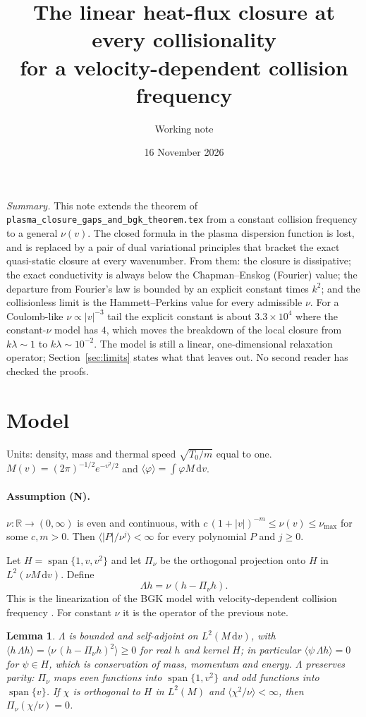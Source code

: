 \documentclass[11pt]{article}
\title{The linear heat-flux closure at every collisionality\\
for a velocity-dependent collision frequency}
\author{Working note}
\date{16 November 2026}
\newcommand{\dd}{\mathrm{d}}
\newcommand{\avg}[1]{\langle #1\rangle}
\newtheorem{lemma}[theorem]{Lemma}
\theoremstyle{remark}
\begin{document}
\maketitle

\noindent\emph{Summary.} This note extends the theorem of
\texttt{plasma\_closure\_gaps\_and\_bgk\_theorem.tex} from a constant
collision frequency to a general $\nu(v)$. The closed formula in the plasma
dispersion function is lost, and is replaced by a pair of dual variational
principles that bracket the exact quasi-static closure at every wavenumber.
From them: the closure is dissipative; the exact conductivity is always
below the Chapman--Enskog (Fourier) value; the departure from Fourier's law
is bounded by an explicit constant times $k^2$; and the collisionless limit
is the Hammett--Perkins value for every admissible $\nu$. For a
Coulomb-like $\nu\propto|v|^{-3}$ tail the explicit constant is about
$3.3\times10^4$ where the constant-$\nu$ model has $4$, which moves the
breakdown of the local closure from $k\lambda\sim1$ to
$k\lambda\sim10^{-2}$. The model is still a linear, one-dimensional
relaxation operator; Section~\ref{sec:limits} states what that leaves out.
No second reader has checked the proofs.

\section{Model}

Units: density, mass and thermal speed $\sqrt{T_0/m}$ equal to one.
$M(v) = (2\pi)^{-1/2}e^{-v^2/2}$ and $\avg{\varphi} = \int\varphi M\,\dd v$.

\paragraph{Assumption (N).} $\nu:\mathbb{R}\to(0,\infty)$ is even and
continuous, with $c\,(1+|v|)^{-m}\le\nu(v)\le\nu_{\max}$ for some $c,m>0$.
Then $\avg{|P|/\nu^j}<\infty$ for every polynomial $P$ and $j\ge0$.

\medskip
Let $H = \operatorname{span}\{1,v,v^2\}$ and let $\Pi_\nu$ be the orthogonal
projection onto $H$ in $L^2(\nu M\,\dd v)$. Define
\begin{equation}
  \Lambda h = \nu\,(h - \Pi_\nu h).
\end{equation}
This is the linearization of the BGK model with velocity-dependent collision
frequency \cite{Struchtrup}. For constant $\nu$ it is the operator of the
previous note.

\begin{lemma}\label{lem:Lambda}
$\Lambda$ is bounded and self-adjoint on $L^2(M\,\dd v)$, with
$\avg{h\,\Lambda h} = \avg{\nu\,(h-\Pi_\nu h)^2}\ge0$ for real $h$ and kernel
$H$; in particular $\avg{\psi\,\Lambda h} = 0$ for $\psi\in H$, which is
conservation of mass, momentum and energy. $\Lambda$ preserves parity:
$\Pi_\nu$ maps even functions into $\operatorname{span}\{1,v^2\}$ and odd
functions into $\operatorname{span}\{v\}$. If $\chi$ is orthogonal to $H$ in
$L^2(M)$ and $\avg{\chi^2/\nu}<\infty$, then $\Pi_\nu(\chi/\nu) = 0$.
\end{lemma}
\end{document}
